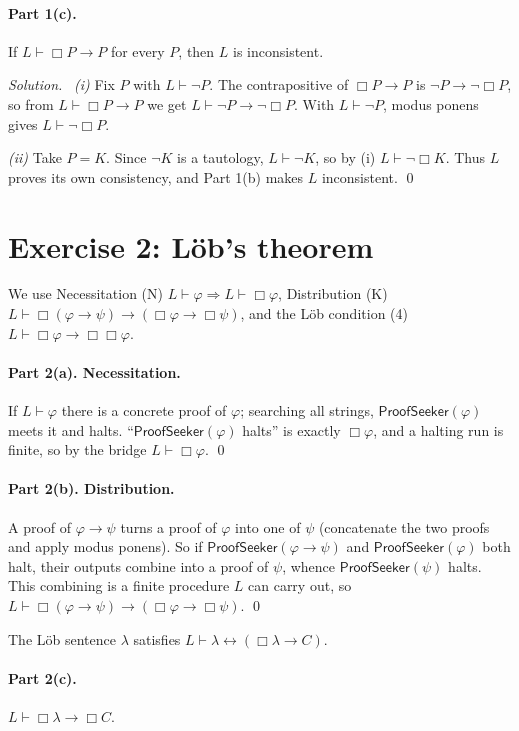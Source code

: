 \documentclass[11pt]{article}
\newcommand{\proves}{\vdash}
\newcommand{\PS}{\mathsf{ProofSeeker}}
\newcommand{\bx}{\Box}
\theoremstyle{plain}
\newcommand{\soln}{\medskip\noindent\textit{Solution.}\ }
\begin{document}
\paragraph{Part 1(c).} If $L\proves \bx P\to P$ for every $P$, then $L$ is inconsistent.

\soln
\emph{(i)} Fix $P$ with $L\proves\neg P$. The contrapositive of $\bx P\to P$ is $\neg P\to\neg\bx P$, so from $L\proves\bx P\to P$ we get $L\proves\neg P\to\neg\bx P$. With $L\proves\neg P$, modus ponens gives $L\proves\neg\bx P$.

\emph{(ii)} Take $P=K$. Since $\neg K$ is a tautology, $L\proves\neg K$, so by (i) $L\proves\neg\bx K$. Thus $L$ proves its own consistency, and Part 1(b) makes $L$ inconsistent. \qed

\section{Exercise 2: L\"ob's theorem}

We use Necessitation (N) $L\proves\varphi\Rightarrow L\proves\bx\varphi$, Distribution (K) $L\proves\bx(\varphi\to\psi)\to(\bx\varphi\to\bx\psi)$, and the L\"ob condition (4) $L\proves\bx\varphi\to\bx\bx\varphi$.

\paragraph{Part 2(a). Necessitation.} If $L\proves\varphi$ there is a concrete proof of $\varphi$; searching all strings, $\PS(\varphi)$ meets it and halts. ``$\PS(\varphi)$ halts'' is exactly $\bx\varphi$, and a halting run is finite, so by the bridge $L\proves\bx\varphi$. \qed

\paragraph{Part 2(b). Distribution.} A proof of $\varphi\to\psi$ turns a proof of $\varphi$ into one of $\psi$ (concatenate the two proofs and apply modus ponens). So if $\PS(\varphi\to\psi)$ and $\PS(\varphi)$ both halt, their outputs combine into a proof of $\psi$, whence $\PS(\psi)$ halts. This combining is a finite procedure $L$ can carry out, so $L\proves\bx(\varphi\to\psi)\to(\bx\varphi\to\bx\psi)$. \qed

\medskip
The L\"ob sentence $\lambda$ satisfies $L\proves\lambda\leftrightarrow(\bx\lambda\to C)$.

\paragraph{Part 2(c).} $L\proves\bx\lambda\to\bx C$.
\end{document}
